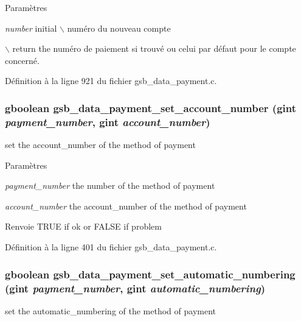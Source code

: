\begin{DoxyParams}{Paramètres}
\item[{\em number}]initial $\backslash$ numéro du nouveau compte\end{DoxyParams}
$\backslash$ return the numéro de paiement si trouvé ou celui par défaut pour le compte concerné. 

Définition à la ligne 921 du fichier gsb\_\-data\_\-payment.c.

\subsubsection[{gsb\_\-data\_\-payment\_\-set\_\-account\_\-number}]{\setlength{\rightskip}{0pt plus 5cm}gboolean gsb\_\-data\_\-payment\_\-set\_\-account\_\-number (gint {\em payment\_\-number}, \/  gint {\em account\_\-number})}\label{gsb__data__payment_8h_a45b6ba45944aef62dbdc97f4b4142979}
set the account\_\-number of the method of payment


\begin{DoxyParams}{Paramètres}
\item[{\em payment\_\-number}]the number of the method of payment \item[{\em account\_\-number}]the account\_\-number of the method of payment\end{DoxyParams}
\begin{DoxyReturn}{Renvoie}
TRUE if ok or FALSE if problem 
\end{DoxyReturn}


Définition à la ligne 401 du fichier gsb\_\-data\_\-payment.c.

\subsubsection[{gsb\_\-data\_\-payment\_\-set\_\-automatic\_\-numbering}]{\setlength{\rightskip}{0pt plus 5cm}gboolean gsb\_\-data\_\-payment\_\-set\_\-automatic\_\-numbering (gint {\em payment\_\-number}, \/  gint {\em automatic\_\-numbering})}\label{gsb__data__payment_8h_aaba6a376380a3b99fa6b38400a245ecb}
set the automatic\_\-numbering of the method of payment


